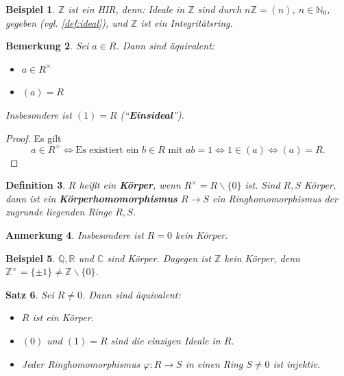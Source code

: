 \documentclass[a4paper, twoside, 11pt, ngerman]{report}
\newcommand{\CC}{\mathds C}
\newcommand{\NN}{\mathds N}
\newcommand{\QQ}{\mathds Q}
\newcommand{\RR}{\mathds R}
\newcommand{\ZZ}{\mathds Z}
\renewcommand{\setminus}{\smallsetminus}
\theoremstyle{definistyle}
\newtheorem{satz}{Satz}[section]
\newtheorem{defini}[satz]{Definition}
\newtheorem{bem}[satz]{Bemerkung}
\newtheorem{anm}[satz]{Anmerkung}
\newtheorem{bsp}[satz]{Beispiel}
\theoremstyle{remark}
\newcommand{\defn}[1]{\textit{\bfseries #1}}
\begin{document}
\begin{bsp}\label{bsp:hauptidealring}
$\ZZ$ ist ein HIR, denn: Ideale in $\ZZ$ sind durch $n \ZZ = (n)$, $n \in \NN_0$, gegeben (vgl. \ref{def:ideal}), und $\ZZ$ ist ein Integritätsring.
\end{bsp}

\begin{bem}\label{bem:einheit_ideal}
Sei $a \in R$. Dann sind äquivalent:
\begin{itemize}
    \item[(i)] $a \in R^{\times}$
    \item[(ii)] $(a) = R$
\end{itemize}
Insbesondere ist $(1) = R$ (``\defn{Einsideal}'').
\end{bem}
\begin{proof}
Es gilt 
\[a \in R^{\times} \iff \text{Es existiert ein } b \in R \text{ mit } a b = 1 \iff 1 \in (a) \iff (a) = R.\]
\end{proof}

\begin{defini}\label{def:koerper}
$R$ heißt ein \defn{Körper}, wenn $R^{\times} = R \setminus \{ 0 \}$ ist. Sind $R,S$ Körper, dann ist ein \defn{Körperhomomorphismus} $R\to S$ ein Ringhomomorphismus der zugrunde liegenden Ringe
$R,S$.
\end{defini}

\begin{anm}\label{anm:kein_koerper}
Insbesondere ist $R = 0$ kein Körper.
\end{anm}

\begin{bsp}\label{bsp:koerper}
$\QQ,\RR$ und $\CC$ sind Körper. Dagegen ist $\ZZ$ kein Körper, denn $\ZZ^\times=\{\pm1\}\neq\ZZ\setminus\{0\}$.
\end{bsp}

\begin{satz}\label{satz:koerper_eigenschaften}
Sei $R \neq 0$. Dann sind äquivalent:
\begin{itemize}
    \item[(i)] $R$ ist ein Körper.
    \item[(ii)] $(0)$ und $(1) = R$ sind die einzigen Ideale in $R$.
    \item[(iii)] Jeder Ringhomomorphismus $\varphi \colon R \to S$ in einen Ring $S \neq 0$ ist injektiv.
\end{itemize}
\end{satz}
\end{document}
